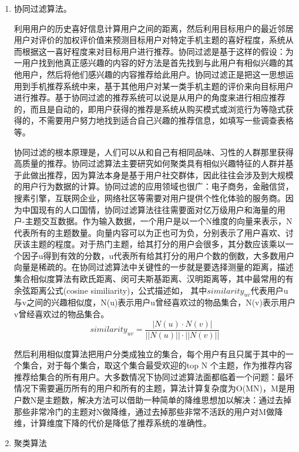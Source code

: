 	\begin{enumerate}[(1)]
	\item 协同过滤算法。

	利用用户的历史喜好信息计算用户之间的距离，然后利用目标用户的最近邻居用户对评价的加权评价值来预测目标用户对特定手机主题的喜好程度，系统从而根据这一喜好程度来对目标用户进行推荐。协同过滤是基于这样的假设：为一用户找到他真正感兴趣的内容的好方法是首先找到与此用户有相似兴趣的其他用户，然后将他们感兴趣的内容推荐给此用户。协同过滤正是把这一思想运用到手机推荐系统中来，基于其他用户对某一类手机主题的评价来向目标用户进行推荐。基于协同过滤的推荐系统可以说是从用户的角度来进行相应推荐的，而且是自动的，即用户获得的推荐是系统从购买模式或浏览行为等隐式获得的，不需要用户努力地找到适合自己兴趣的推荐信息，如填写一些调查表格等。

	协同过滤的根本原理是，人们可以从和自己有相同品味、习性的人群那里获得高质量的推荐。协同过滤算法主要研究如何聚类具有相似兴趣特征的人群并基于此做出推荐，因为算法本身是基于用户社交群体，因此往往会涉及到大规模的用户行为数据的计算。协同过滤的应用领域也很广：电子商务，金融信贷，搜素引擎，互联网企业，网络社区等需要对用户提供个性化体验的服务商。因为中国现有的人口国情，协同过滤算法往往需要面对亿万级用户和海量的用户-主题交互数据。作为输入数据，一个用户是以一个N维度的向量来表示，N代表所有的主题数量。向量内容可以为正也可为负，分别表示了用户喜欢、讨厌该主题的程度。对于热门主题，给其打分的用户会很多，其分数应该乘以一个因子u得到有效的分数，u代表所有给其打分的用户个数的倒数，大多数用户向量是稀疏的。在协同过滤算法中关键性的一步就是要选择测量的距离，描述集合相似度算法有欧氏距离、闵可夫斯基距离、汉明距离等，其中最常用的有余弦距离公式(cosine similiarity)，公式描述如，
	其中$similarity_{uv}$代表用户u与v之间的兴趣相似度，N(u)表示用户u曾经喜欢过的物品集合，N(v)表示用户v曾经喜欢过的物品集合。
	\begin{equation}
	similarity_{uv} = \frac{|N(u)\cdot N(v)|}{||N(u)||\cdot||N(v)||}
	\label{cosine-similiarity}
	\end{equation}
	
	然后利用相似度算法把用户分类成独立的集合，每个用户有且只属于其中的一个集合，对于每个集合，取这个集合最受欢迎的top N 个主题，作为推荐内容推荐给集合的所有用户。大多数情况下协同过滤算法面都临着一个问题：最坏情况下需要遍历所有的用户和所有的主题，算法计算复杂度为O(MN)，M是用户数N是主题数，解决方法可以借助一种简单的降维思想加以解决：通过去掉那些非常冷门的主题对N做降维，通过去掉那些非常不活跃的用户对M做降维，计算维度下降的代价是降低了推荐系统的准确性。
	\item 聚类算法


\end{enumerate}
